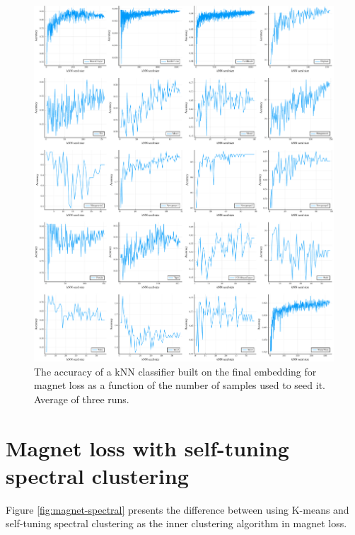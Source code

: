 \begin{figure}[h]
  \centering
  \includegraphics[width=\textwidth]{images/magnet-toy/kNN/magnet-toy-kNN.pdf}
  \caption{The accuracy of a kNN classifier built on the final embedding for magnet loss as a function of the number of samples used to seed it. Average of three runs.}\label{fig:magnet-toy-kNN}
\end{figure}


\section{Magnet loss with self-tuning spectral clustering}

Figure \ref{fig:magnet-spectral} presents the difference between using K-means and self-tuning spectral clustering as the inner clustering algorithm in magnet loss.


